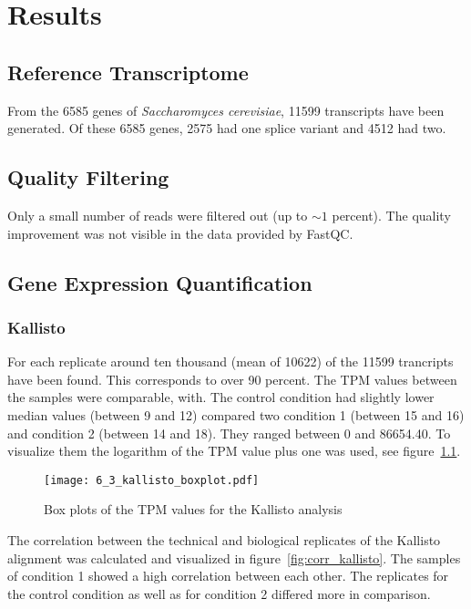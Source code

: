 \chapter{Results}

\section{Reference Transcriptome}

From the 6585 genes of \textit{Saccharomyces cerevisiae}, 11599 transcripts have been generated. 
Of these 6585 genes, 2575 had one splice variant and 4512 had two.

\section{Quality Filtering}

Only a small number of reads were filtered out (up to $\sim 1$ percent).
The quality improvement was not visible in the data provided by 
FastQC.

\section{Gene Expression Quantification}
\subsection{Kallisto}
For each replicate around ten thousand (mean of 10622) of the 11599 trancripts have 
been found. This corresponds to over 90 percent. The TPM values between the samples were comparable, 
with. The control condition had slightly lower median values (between 9 and 12) compared two 
condition 1 (between 15 and 16) and condition 2 (between 14 and 18). 
They ranged between 0 and 86654.40. To visualize them the logarithm of the 
TPM value plus one was used, see
figure~\ref{fig:box_kallisto}.

\begin{figure}[H]
  \center
  \texttt{[image: 6\_3\_kallisto\_boxplot.pdf]}
  \caption{Box plots of the TPM values for the Kallisto analysis}\label{fig:box_kallisto}
\end{figure}

The correlation between the technical and biological replicates of the Kallisto 
alignment was calculated and visualized in 
figure~\ref{fig:corr_kallisto}.
The samples of condition 1 showed a high correlation between each other. The replicates for 
the control condition as well as for condition 2 differed more in comparison. 

